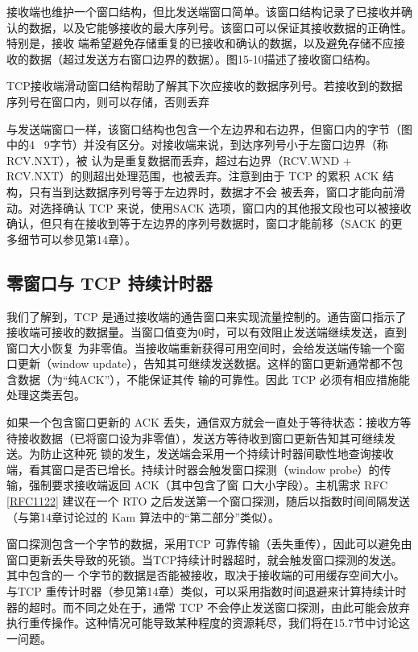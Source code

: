 接收端也维护一个窗口结构，但比发送端窗口简单。该窗口结构记录了已接收并确认的数据，以及它能够接收的最大序列号。该窗口可以保证其接收数据的正确性。特别是，接收
端希望避免存储重复的已接收和确认的数据，以及避免存储不应接收的数据（超过发送方右窗口边界的数据）。图15-10描述了接收窗口结构。

TCP接收端滑动窗口结构帮助了解其下次应接收的数据序列号。若接收到的数据序列号在窗口内，则可以存储，否则丢弃

与发送端窗口一样，该窗口结构也包含一个左边界和右边界，但窗口内的字节（图中的4 ~9字节）并没有区分。对接收端来说，到达序列号小于左窗口边界（称 RCV.NXT），被
认为是重复数据而丢弃，超过右边界（RCV.WND + RCV.NXT）的则超出处理范围，也被丢弃。注意到由于 TCP 的累积 ACK 结构，只有当到达数据序列号等于左边界时，数据才不会
被丢奔，窗口才能向前滑动。对选择确认 TCP 来说，使用SACK 选项，窗口内的其他报文段也可以被接收确认，但只有在接收到等于左边界的序列号数据时，窗口才能前移（SACK
的更多细节可以参见第14章）。

\subsection{零窗口与 TCP 持续计时器}

我们了解到，TCP 是通过接收端的通告窗口来实现流量控制的。通告窗口指示了接收端可接收的数据量。当窗口值变为0时，可以有效阻止发送端继续发送，直到窗口大小恢复
为非零值。当接收端重新获得可用空间时，会给发送端传输一个窗口更新（window update），告知其可继续发送数据。这样的窗口更新通常都不包含数据（为“纯ACK”），不能保证其传
输的可靠性。因此 TCP 必须有相应措施能处理这类丟包。

如果一个包含窗口更新的 ACK 丢失，通信双方就会一直处于等待状态：接收方等待接收数据（已将窗口设为非零值），发送方等待收到窗口更新告知其可继续发送。为防止这种死
锁的发生，发送端会采用一个持续计时器间歇性地查询接收端，看其窗口是否已增长。持续计时器会触发窗口探测（window probe）的传输，强制要求接收端返回 ACK（其中包含了窗
口大小字段）。主机需求 RFC \href{https://www.rfc-editor.org/rfc/rfc1122}{[RFC1122]} 建议在一个 RTO 之后发送第一个窗口探测，随后以指数时间间隔发送（与第14章讨论过的 Kam 算法中的“第二部分”类似）。

窗口探测包含一个字节的数据，采用TCP 可靠传输（丢失重传），因此可以避免由窗口更新丢失导致的死锁。当TCP持续计时器超时，就会触发窗口探测的发送。其中包含的一
个字节的数据是否能被接收，取决于接收端的可用缓存空间大小。与TCP 重传计时器（参见第14章）类似，可以采用指数时间退避来计算持续计时器的超时。而不同之处在于，通常
TCP 不会停止发送窗口探测，由此可能会放弃执行重传操作。这种情况可能导致某种程度的资源耗尽，我们将在15.7节中讨论这一问题。

